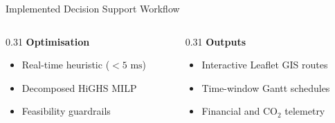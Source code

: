 \documentclass[aspectratio=169,10pt]{beamer}
\begin{document}
\begin{frame}{Implemented Decision Support Workflow}
\begin{columns}[T,totalwidth=\textwidth]
\begin{column}{0.31\textwidth}
\textbf{\color{Primary}\small Optimisation}
\footnotesize
\begin{itemize}
\item Real-time heuristic ($<5\text{ ms}$)
\item Decomposed HiGHS MILP
\item Feasibility guardrails
\end{itemize}
\end{column}

\begin{column}{0.31\textwidth}
\textbf{\color{Primary}\small Outputs}
\footnotesize
\begin{itemize}
\item Interactive Leaflet GIS routes
\item Time-window Gantt schedules
\item Financial and $\text{CO}_2$ telemetry
\end{itemize}
\end{column}

\end{columns}

\end{frame}


\end{document}
